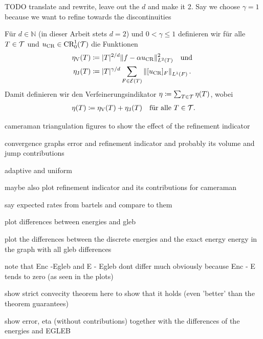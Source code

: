 \begin{frame}
  TODO translate and rewrite, leave out the $d$ and make it 2. Say we choose
  $\gamma=1$ because we want to refine towards the discontinuities

  \begin{definition}[Verfeinerungsindikator]
    Für $d\in\mathbb{N}$ (in dieser Arbeit stets $d=2$) und $0<\gamma\leq 1$
    definieren wir für alle $T\in\mathcal{T}$ und $u_\textup{CR}\in\textup{CR}^1_0(\mathcal{T})$ die
    Funktionen
    \begin{align*}
      \eta_\text{V}(T)
      &\coloneqq
      |T|^{2/d}\Vert f-\alpha u_\textup{CR}\Vert^2_{L^2(T)}\quad\text{und }\\
      \eta_\text{J}(T)
      &\coloneqq
      |T|^{\gamma/d}\sum_{F\in\mathcal{E}(T)}\left\Vert [u_\textup{CR}]_F\right\Vert_{L^1(F)}.
    \end{align*} 
    Damit definieren wir den Verfeinerungsindikator
    $\eta\coloneqq\sum_{T\in\mathcal{T}}\eta(T)$, wobei
    \begin{align*} 
      \eta (T)
      \coloneqq
      \eta_\text{V}(T) + \eta_\text{J}(T)\quad\text{für alle } T\in\mathcal{T}.
    \end{align*} 
  \end{definition}
\end{frame}

\begin{frame}
  cameraman triangulation figures to show the effect of the refinement 
  indicator
\end{frame}

\begin{frame}
  convergence graphs error and refinement indicator and probably its volume
  and jump contributions

  adaptive and uniform

  maybe also plot refinement indicator and its contributions for cameraman

  say expected rates from bartels and compare to them
\end{frame}


\begin{frame}
  plot differences between energies and gleb 

  plot the differences between the discrete energies and the exact energy
  energy in the graph with all gleb differences

  note that Enc -Egleb and E - Egleb dont differ much obviously because
  Enc - E tends to zero (as seen in the plots)

  show strict convecity theorem here to show that it holds (even 'better' than
  the theorem guarantees)
\end{frame}

\begin{frame}
  show error, eta (without contributions) together with the differences
  of the energies and EGLEB
\end{frame}
